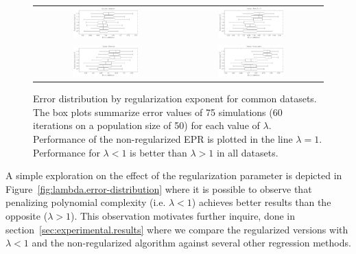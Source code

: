 \documentclass[review,preprint]{elsarticle}
\newcommand{\revised}[2]{}
\begin{document}
\begin{figure}[tb]\begin{center}
\begin{tabular}{cc}
\includegraphics[width=0.475\textwidth]{Fig1a.pdf}
&
\includegraphics[width=0.475\textwidth]{Fig1b.pdf}
\\
\includegraphics[width=0.475\textwidth]{Fig1c.pdf}
&
\includegraphics[width=0.475\textwidth]{Fig1d.pdf}
\end{tabular}

\caption{Error distribution by regularization exponent for common datasets. The box plots summarize error values of 75 simulations (60 iterations on a population size of 50) for each value of $\lambda$. Performance of the non-regularized \ac{EPR} is plotted in the line $\lambda = 1$. Performance for $\lambda < 1$ is better than $\lambda > 1$ in all datasets.}
\label{fig:lambda.error-distribution}\label{Abalone_dataset_lambdas}\label{Auto-MPG_dataset_lambdas}

\end{center}\end{figure}

A simple exploration on the effect of the regularization parameter is depicted in Figure~\ref{fig:lambda.error-distribution} where it is possible to observe that penalizing polynomial complexity (i.e. $\lambda < 1$) achieves better results than the opposite ($\lambda > 1$). This observation motivates further inquire, done in section~\ref{sec:experimental.results} where we compare the regularized versions with $\lambda < 1$ and the non-regularized algorithm against several other regression methods.\revised{please clarify this paragraph and justify this claim}{we rephrased the statement.}
\end{document}
